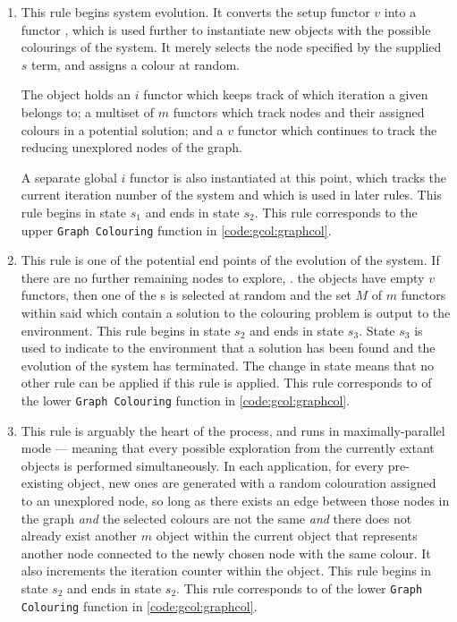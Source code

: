\begin{enumerate}
\item This rule begins system evolution.  It converts the setup \gls{functor} \(v\) into a \gls{functor} \bo{}, which is used further to instantiate new objects with the possible colourings of the system.  It merely selects the node specified by the supplied \(s\) term, and assigns a colour at random.

The \bo{} object holds an \(i\) \gls{functor} which keeps track of which iteration a given \bo{} belongs to; a multiset of \(m\) \glspl{functor} which track nodes and their assigned colours in a potential solution; and a \(v\) \gls{functor} which continues to track the reducing unexplored nodes of the graph.

A separate global \(i\) \gls{functor} is also instantiated at this point, which tracks the current iteration number of the system and which is used in later rules.  This rule begins in state \(s_1\) and ends in state \(s_2\).  This rule corresponds to the upper \texttt{Graph Colouring} function in \cref{code:gcol:graphcol}.

\item This rule is one of the potential end points of the evolution of the system.  If there are no further remaining nodes to explore, \ie{}. the \bo{} objects have empty \(v\) \glspl{functor}, then one of the \bo{}s is selected at random and the set \(M\) of \(m\) \glspl{functor} within said \bo{} which contain a solution to the colouring problem is output to the environment.  This rule begins in state \(s_2\) and ends in state \(s_3\).  State \(s_3\) is used to indicate to the environment that a solution has been found and the evolution of the system has terminated.  The change in state means that no other rule can be applied if this rule is applied.  This rule corresponds to  of the lower \texttt{Graph Colouring} function in \cref{code:gcol:graphcol}.

\item This rule is arguably the heart of the process, and runs in maximally-parallel mode --- meaning that every possible exploration from the currently extant \bo{} objects is performed simultaneously.  In each application, for every pre-existing \bo{} object, new ones are generated with a random colouration assigned to an unexplored node, so long as there exists an edge between those nodes in the graph \emph{and} the selected colours are not the same \emph{and} there does not already exist another \(m\) object within the current \bo{} object that represents another node connected to the newly chosen node with the same colour.  It also increments the iteration counter within the \bo{} object.  This rule begins in state \(s_2\) and ends in state \(s_2\).  This rule corresponds to  of the lower \texttt{Graph Colouring} function in \cref{code:gcol:graphcol}.


\end{enumerate}
